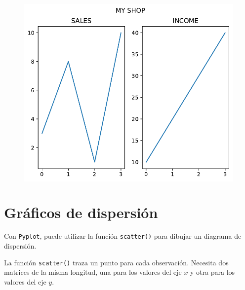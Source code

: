 \begin{code}
\begin{figure}
  \centering
  \includegraphics[scale=0.6]{img/grafica1035.pdf}
\end{figure}
\end{code}

\section{Gráficos de dispersión}

Con \texttt{Pyplot}, puede utilizar la función \texttt{scatter()} para
dibujar un diagrama de dispersión.

La función \texttt{scatter()} traza un punto para cada observación.
Necesita dos matrices de la misma longitud, una para los valores del eje
\(x\) y otra para los valores del eje \(y\).

